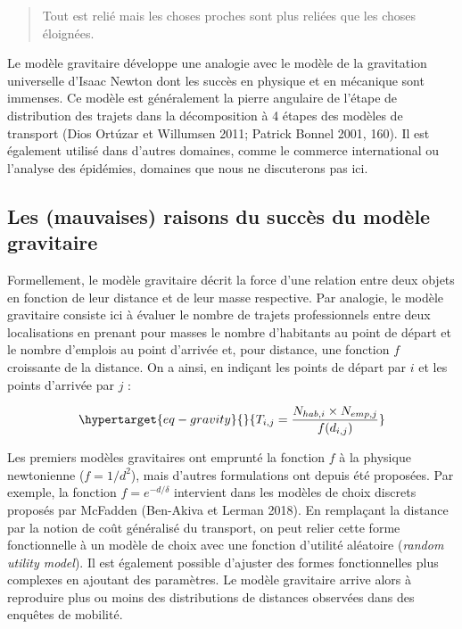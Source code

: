 \documentclass[
  10pt,
  a4paper,
  numbers=noendperiod,
  DIV=9]{scrreprt}
\begin{document}
\begin{quote}
Tout est relié mais les choses proches sont plus reliées que les choses
éloignées.
\end{quote}

Le modèle gravitaire développe une analogie avec le modèle de la
gravitation universelle d'Isaac Newton dont les succès en physique et en
mécanique sont immenses. Ce modèle est généralement la pierre angulaire
de l'étape de distribution des trajets dans la décomposition à 4 étapes
des modèles de transport (Dios Ortúzar et Willumsen 2011; Patrick Bonnel
2001, 160). Il est également utilisé dans d'autres domaines, comme le
commerce international ou l'analyse des épidémies, domaines que nous ne
discuterons pas ici.

\hypertarget{les-mauvaises-raisons-du-succuxe8s-du-moduxe8le-gravitaire}{%
\subsection{Les (mauvaises) raisons du succès du modèle
gravitaire}\label{les-mauvaises-raisons-du-succuxe8s-du-moduxe8le-gravitaire}}

Formellement, le modèle gravitaire décrit la force d'une relation entre
deux objets en fonction de leur distance et de leur masse respective.
Par analogie, le modèle gravitaire consiste ici à évaluer le nombre de
trajets professionnels entre deux localisations en prenant pour masses
le nombre d'habitants au point de départ et le nombre d'emplois au point
d'arrivée et, pour distance, une fonction \(f\) croissante de la
distance. On a ainsi, en indiçant les points de départ par \(i\) et les
points d'arrivée par \(j\) :

\begin{equation}\protect\hypertarget{eq-gravity}{}{
T_{i,j} = \frac {N_{hab, i}\times N_{emp, j}} {f(d_{i,j})}
}\label{eq-gravity}\end{equation}

Les premiers modèles gravitaires ont emprunté la fonction \(f\) à la
physique newtonienne (\(f=1/d^2\)), mais d'autres formulations ont
depuis été proposées. Par exemple, la fonction \(f=e^{-d/\delta}\)
intervient dans les modèles de choix discrets proposés par McFadden
(Ben-Akiva et Lerman 2018). En remplaçant la distance par la notion de
coût généralisé du transport, on peut relier cette forme fonctionnelle à
un modèle de choix avec une fonction d'utilité aléatoire (\emph{random
utility model}). Il est également possible d'ajuster des formes
fonctionnelles plus complexes en ajoutant des paramètres. Le modèle
gravitaire arrive alors à reproduire plus ou moins des distributions de
distances observées dans des enquêtes de mobilité.
\end{document}
